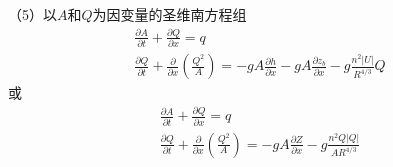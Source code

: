 （5）以$A$和$Q$为因变量的圣维南方程组
\begin{equation}
  \begin{gathered}
    \frac{\partial A}{\partial t}
    +
    \frac{\partial Q}{\partial x}
    =
    q
  \\
  \frac{\partial Q}{\partial t}
  +
  \frac{\partial}{\partial x}\left(\frac{Q^{2}}{A}\right)
  =
  -gA\frac{\partial h}{\partial x}
  -gA\frac{\partial z_{b}}{\partial x}
  -g\frac{n^{2}|U|}{R^{4/3}}Q
  \end{gathered}
  \label{EqCGe_SV_AQ_1}
\end{equation}
或
\begin{equation}
  \begin{gathered}
    \frac{\partial A}{\partial t}
    +
    \frac{\partial Q}{\partial x}
    =
    q
  \\
  \frac{\partial Q}{\partial t}
  +
  \frac{\partial}{\partial x}\left(\frac{Q^{2}}{A}\right)
  =
  -
  gA\frac{\partial Z}{\partial x}
  -
  g\frac{n^{2}Q|Q|}{AR^{4/3}}
  \end{gathered}
  \label{EqCGe_SV_AQ_2}
\end{equation}
